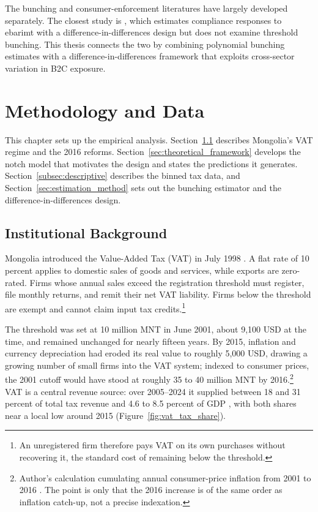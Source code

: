 \documentclass[12pt,oneside,a4paper]{report}
\begin{document}
The bunching and consumer-enforcement literatures have largely developed separately. The closest study is \textcite{nyamdavaa2023does}, which estimates compliance responses to ebarimt with a difference-in-differences design but does not examine threshold bunching. This thesis connects the two by combining polynomial bunching estimates with a difference-in-differences framework that exploits cross-sector variation in B2C exposure.



\chapter{Methodology and Data}
\label{ch:methods}

This chapter sets up the empirical analysis. Section~\ref{sec:institutional} describes Mongolia's VAT regime and the 2016 reforms. Section~\ref{sec:theoretical_framework} develops the notch model that motivates the design and states the predictions it generates. Section~\ref{subsec:descriptive} describes the binned tax data, and Section~\ref{sec:estimation_method} sets out the bunching estimator and the difference-in-differences design.


\section{Institutional Background}
\label{sec:institutional}

Mongolia introduced the Value-Added Tax (VAT) in July 1998 \parencite{mta_publication_2023}. A flat rate of 10 percent applies to domestic sales of goods and services, while exports are zero-rated. Firms whose annual sales exceed the registration threshold must register, file monthly returns, and remit their net VAT liability. Firms below the threshold are exempt and cannot claim input tax credits.\footnote{An unregistered firm therefore pays VAT on its own purchases without recovering it, the standard cost of remaining below the threshold.}

The threshold was set at 10 million MNT in June 2001, about 9,100 USD at the time, and remained unchanged for nearly fifteen years. By 2015, inflation and currency depreciation had eroded its real value to roughly 5,000 USD, drawing a growing number of small firms into the VAT system; indexed to consumer prices, the 2001 cutoff would have stood at roughly 35 to 40 million MNT by 2016.\footnote{Author's calculation cumulating annual consumer-price inflation from 2001 to 2016 \parencite{nso_cpi}. The point is only that the 2016 increase is of the same order as inflation catch-up, not a precise indexation.} VAT is a central revenue source: over 2005--2024 it supplied between 18 and 31 percent of total tax revenue and 4.6 to 8.5 percent of GDP \parencite{nso_government_budget, nso_gdp}, with both shares near a local low around 2015 (Figure~\ref{fig:vat_tax_share}). 
\end{document}
